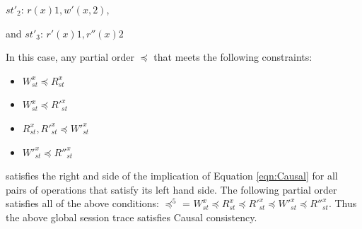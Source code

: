 \documentclass[journal,compsoc]{IEEEtran}
\begin{document}
 $\mathit{st}'_2$: $r(x){1}, w'(x,2)$,
 
 and  $\mathit{st}'_3$: $r'(x){1}, r''(x){2}$ 
 
In this case, any partial order  $\preccurlyeq$  that meets the following constraints: 

\begin{itemize}

\item $W^x_{\mathit{st}}   \preccurlyeq R^x_{\mathit{st}} $
\item $W^x_{\mathit{st}}  \preccurlyeq R'^x_{\mathit{st}} $
\item $R^x_{\mathit{st}} ,  R'^x_{\mathit{st}}   \preccurlyeq W'^x_{\mathit{st}} $
\item $ W'^x_{\mathit{st}} \preccurlyeq R''^x_{\mathit{st}}$
\end{itemize}

\noindent satisfies the right and side of the implication of Equation \ref{eqn:Causal} for all pairs of operations that satisfy its left hand side. The following partial order satisfies all of the above conditions: $\preccurlyeq^5$ = $W^x_{\mathit{st}}   \preccurlyeq R^x_{\mathit{st}}  \preccurlyeq R'^x_{\mathit{st}}  \preccurlyeq  W'^x_{\mathit{st}}   \preccurlyeq R''^x_{\mathit{st}} $.  Thus the above  global session trace satisfies Causal consistency. 
\end{document}
